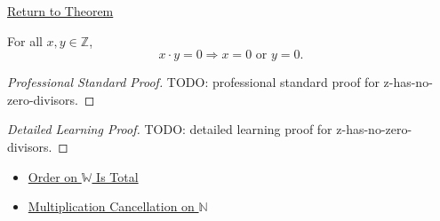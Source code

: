 \newpage
{}
\label{prf:z-has-no-zero-divisors}

\begin{remark*}[Return]
\hyperref[thm:z-has-no-zero-divisors]{Return to Theorem}
\end{remark*}

\begin{theorem*}
For all $x,y\in\mathbb{Z}$,
\[
x\cdot y=0 \Longrightarrow x=0 \text{ or } y=0.
\]
\end{theorem*}

\begin{proof}[Professional Standard Proof]
\LRAProofBodyStart
TODO: professional standard proof for z-has-no-zero-divisors.
\end{proof}

\begin{proof}[Detailed Learning Proof]
\LRAProofBodyStart
TODO: detailed learning proof for z-has-no-zero-divisors.
\end{proof}

\begin{remark*}
\end{remark*}

\begin{dependencies}
\begin{itemize}
  \item \hyperref[thm:order-on-w-total]{Order on $\mathbb{W}$ Is Total}
  \item \hyperref[thm:multiplication-cancellation]{Multiplication Cancellation on $\mathbb{N}$}
\end{itemize}
\end{dependencies}

\clearpage
